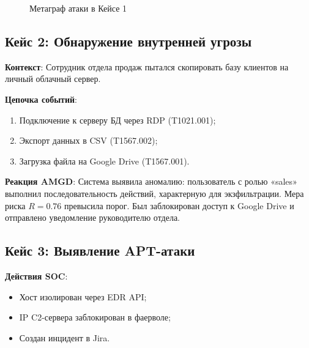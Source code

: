 \begin{figure}[ht]
\centering
{}
\caption{Метаграф атаки в Кейсе 1}
\label{fig:case1_graph}
\end{figure}

\subsection{Кейс 2: Обнаружение внутренней угрозы}

\textbf{Контекст}:  
Сотрудник отдела продаж пытался скопировать базу клиентов на личный облачный сервер.

\textbf{Цепочка событий}:
\begin{enumerate}
    \item Подключение к серверу БД через RDP (T1021.001);
    \item Экспорт данных в CSV (T1567.002);
    \item Загрузка файла на Google Drive (T1567.001).
\end{enumerate}

\textbf{Реакция AMGD}:  
Система выявила аномалию: пользователь с ролью «sales» выполнил последовательность действий, характерную для экзфильтрации. Мера риска $R = 0.76$ превысила порог. Был заблокирован доступ к Google Drive и отправлено уведомление руководителю отдела.

\subsection{Кейс 3: Выявление APT-атаки}

\textbf{Действия SOC}:  
\begin{itemize}
    \item Хост изолирован через EDR API;
    \item IP C2-сервера заблокирован в фаерволе;
    \item Создан инцидент в Jira.
\end{itemize}
